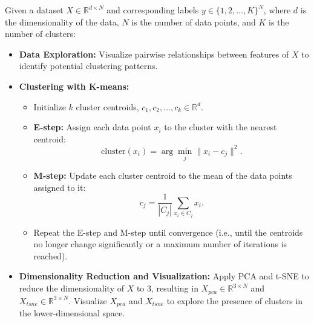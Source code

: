 \documentclass[12pt]{article}
\begin{document}
Given a dataset \(X \in \mathbb{R}^{d \times N}\) and corresponding labels \(y \in \{1, 2, \dots, K\}^N\), where \(d\) is the dimensionality of the data, \(N\) is the number of data points, and \(K\) is the number of clusters:
\begin{itemize}
    \item \textbf{Data Exploration:} Visualize pairwise relationships between features of \(X\) to identify potential clustering patterns.
    \item \textbf{Clustering with K-means:}
    \begin{itemize}
        \item Initialize \(k\) cluster centroids, \(c_1, c_2, \dots, c_k \in \mathbb{R}^d\).
        \item \textbf{E-step:} Assign each data point \(x_i\) to the cluster with the nearest centroid:
        \[
        \text{cluster}(x_i) = \arg\min_j \|x_i - c_j\|^2.
        \]
        \item \textbf{M-step:} Update each cluster centroid to the mean of the data points assigned to it:
        \[
        c_j = \frac{1}{|C_j|} \sum_{x_i \in C_j} x_i.
        \]
        \item Repeat the E-step and M-step until convergence (i.e., until the centroids no longer change significantly or a maximum number of iterations is reached).
    \end{itemize}
    \item \textbf{Dimensionality Reduction and Visualization:} Apply PCA and t-SNE to reduce the dimensionality of \(X\) to 3, resulting in \(X_{pca} \in \mathbb{R}^{3 \times N}\) and \(X_{tsne} \in \mathbb{R}^{3 \times N}\). Visualize \(X_{pca}\) and \(X_{tsne}\) to explore the presence of clusters in the lower-dimensional space.
\end{itemize}
\end{document}
